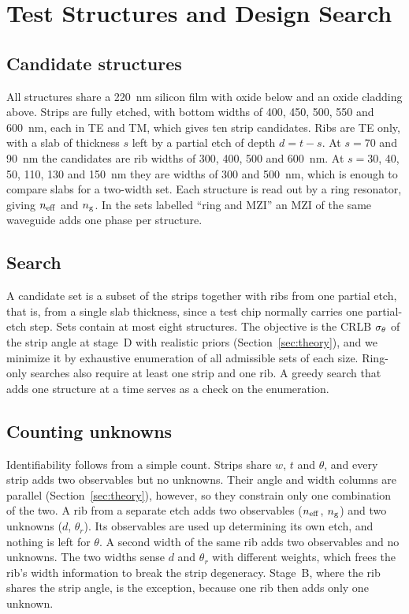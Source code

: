 \section{Test Structures and Design Search}
\label{sec:structures}

\subsection{Candidate structures}

All structures share a \qty{220}{nm} silicon film with oxide below and an oxide cladding above. Strips are fully
etched, with bottom widths of 400, 450, 500, 550 and \qty{600}{nm}, each in TE and TM, which gives ten strip
candidates. Ribs are TE only, with a slab of thickness $s$ left by a partial etch of depth $d=t-s$. At $s=70$ and
\qty{90}{nm} the candidates are rib widths of 300, 400, 500 and \qty{600}{nm}. At $s=30$, 40, 50, 110, 130 and
\qty{150}{nm} they are widths of 300 and \qty{500}{nm}, which is enough to compare slabs for a two-width set. Each
structure is read out by a ring resonator, giving $n_\mathrm{eff}$ and $n_\mathrm{g}$. In the sets labelled ``ring and MZI'' an MZI of
the same waveguide adds one phase per structure.

\subsection{Search}

A candidate set is a subset of the strips together with ribs from one partial etch, that is, from a single slab
thickness, since a test chip normally carries one partial-etch step. Sets contain at most eight structures. The
objective is the CRLB $\sigma_\theta$ of the strip angle at stage~D with realistic priors (Section~\ref{sec:theory}), and we
minimize it by exhaustive enumeration of all admissible sets of each size. Ring-only searches also require at least
one strip and one rib. A greedy search that adds one structure at a time serves as a check on the enumeration.

\subsection{Counting unknowns}

Identifiability follows from a simple count. Strips share $w$, $t$ and $\theta$, and every strip adds two observables
but no unknowns. Their angle and width columns are parallel (Section~\ref{sec:theory}), however, so they constrain
only one combination of the two. A rib from a separate etch adds two observables ($n_\mathrm{eff}$, $n_\mathrm{g}$) and two unknowns
($d$, $\theta_r$). Its observables are used up determining its own etch, and nothing is left for $\theta$. A second
width of the same rib adds two observables and no unknowns. The two widths sense $d$ and $\theta_r$ with different
weights, which frees the rib's width information to break the strip degeneracy. Stage~B, where the rib shares the
strip angle, is the exception, because one rib then adds only one unknown.

